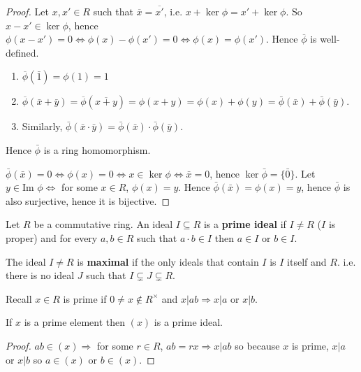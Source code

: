 \begin{proof}
	Let $x, x' \in R$ such that $\overline{x} = \overline{x'}$, i.e. $x + \ker \phi = x' + \ker \phi$. So $x - x' \in \ker \phi$, hence $\phi(x - x') = 0 \Leftrightarrow \phi(x) - \phi(x') = 0 \Leftrightarrow \phi(x) = \phi(x')$. Hence $\overline{\phi}$ is well-defined.

	\begin{enumerate}
		\item $\overline{\phi}(\bar{1}) = \phi(1) = 1$
		\item $\overline{\phi}(\bar{x} + \bar{y}) = \overline{\phi}(\overline{x + y}) = \phi(x + y) = \phi(x) + \phi(y) = \bar{\phi}(\bar{x}) + \bar{\phi}(\bar{y})$.
		\item Similarly, $\bar{\phi}(\bar{x}\cdot \bar{y}) = \bar{\phi}(\bar{x}) \cdot \bar{\phi}(\bar{y})$.
	\end{enumerate}

	Hence $\bar{\phi}$ is a ring homomorphism.

	$\bar{\phi}(\bar{x}) = 0 \Leftrightarrow \phi(x) = 0 \Leftrightarrow x \in \ker \phi \Leftrightarrow \bar{x} = 0$, hence $\ker \bar{\phi} = \{\bar{0}\}$.
	Let $y \in \text{Im } \phi \Leftrightarrow$ for some $x \in R$, $\phi(x) = y$. Hence $\bar{\phi}(\bar{x}) = \phi(x) = y$, hence $\bar{\phi}$ is also surjective, hence it is bijective.
\end{proof}

\begin{definition}
	Let $R$ be a commutative ring. An ideal $I \subseteq R$ is a \textbf{prime ideal} if $I \ne R$ ($I$ is proper) and for every $a, b \in R$ such that $a \cdot b \in I$ then $a \in I$ or $b \in I$.

	The ideal $I \ne R$ is \textbf{maximal} if the only ideals that contain $I$ is $I$ itself and $R$. i.e. there is no ideal $J$ such that $I \subsetneq J \subsetneq R$.
\end{definition}

\begin{theorem}
	Recall $x \in R$ is prime if $0 \ne x \notin R^{\times}$ and $x | ab \Rightarrow x | a$ or $x | b$.

	If $x$ is a prime element then $(x)$ is a prime ideal.
\end{theorem}

\begin{proof}
	$ab \in (x) \Rightarrow$ for some $r \in R$, $ab = rx \Rightarrow x | ab$ so because $x$ is prime, $x | a$ or $x | b$ so $a \in (x)$ or $b \in (x)$.
\end{proof}


